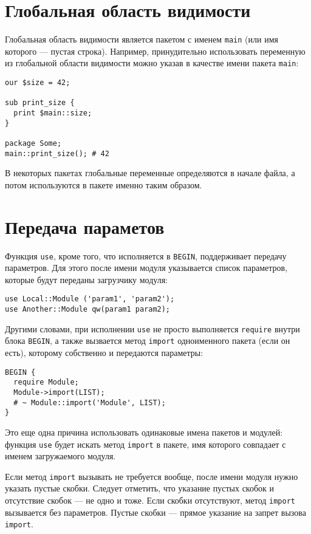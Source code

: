 \section{Глобальная область видимости} %
Глобальная область видимости является пакетом с именем \verb|main| (или имя которого --- пустая строка). Например, принудительно использовать переменную из глобальной области видимости можно указав в качестве имени пакета \verb|main|:
\begin{verbatim}
our $size = 42;

sub print_size {
  print $main::size;
}

package Some;
main::print_size(); # 42
\end{verbatim}
В некоторых пакетах глобальные переменные определяются в начале файла, а потом используются в пакете именно таким образом.

\section{Передача параметов} %
Функция \verb|use|, кроме того, что исполняется в \verb|BEGIN|, поддерживает передачу параметров. Для этого после имени модуля указывается список параметров, которые будут переданы загрузчику модуля:
\begin{verbatim}
use Local::Module ('param1', 'param2');
use Another::Module qw(param1 param2);
\end{verbatim}
Другими словами, при исполнении \verb|use| не просто выполняется \verb|require| внутри блока \verb|BEGIN|, а также вызвается метод \verb|import| одноименного пакета (если он есть), которому собственно и передаются параметры:
\begin{verbatim}
BEGIN {
  require Module;
  Module->import(LIST);
  # ~ Module::import('Module', LIST);
}
\end{verbatim}
Это еще одна причина использовать одинаковые имена пакетов и модулей: функция \verb|use| будет искать метод \verb|import| в пакете, имя которого совпадает с именем загружаемого модуля.

Если метод \verb|import| вызывать не требуется вообще, после имени модуля нужно указать пустые скобки. Следует отметить, что указание пустых скобок и отсутствие скобок --- не одно и тоже. Если скобки отсутствуют, метод \verb|import| вызывается без параметров. Пустые скобки --- прямое указание на запрет вызова \verb|import|.


